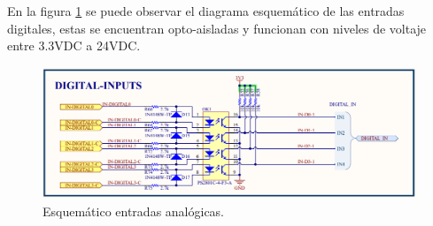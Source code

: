 En la figura \ref{fig:digitalinputs} se puede observar el diagrama esquemático de las entradas digitales, estas se encuentran opto-aisladas y funcionan con niveles de voltaje entre 3.3VDC a 24VDC.

\begin{figure}[h]
	\centering
	\includegraphics[scale=.45]{./Figures/digitalinputs.PNG}
	\caption{Esquemático entradas analógicas.}
	\label{fig:digitalinputs}
\end{figure}


	






	
		

		
		
		
